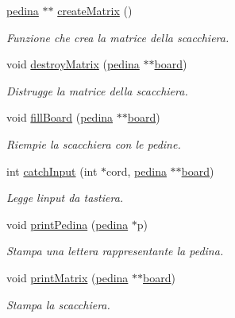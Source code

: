 \begin{DoxyCompactItemize}
\hyperlink{ml__lib_8h_a71fee95122b31f5cb0b07d9c16ffa3a5}{pedina} $\ast$$\ast$ \hyperlink{group__Funzioni_ga4a5eb161590279b5189a68bb27f0882e}{create\+Matrix} ()
\begin{DoxyCompactList}\small\item\em Funzione che crea la matrice della scacchiera. \end{DoxyCompactList}\item 
void \hyperlink{group__Funzioni_ga898a4ffd57725b4666aa768ca71f1e1f}{destroy\+Matrix} (\hyperlink{ml__lib_8h_a71fee95122b31f5cb0b07d9c16ffa3a5}{pedina} $\ast$$\ast$\hyperlink{ml__main_8c_a62a3fe3d1df9ff58883b669f7f24e516}{board})
\begin{DoxyCompactList}\small\item\em Distrugge la matrice della scacchiera. \end{DoxyCompactList}\item 
void \hyperlink{group__Funzioni_ga421a28d47106a4070c6eea92c1401821}{fill\+Board} (\hyperlink{ml__lib_8h_a71fee95122b31f5cb0b07d9c16ffa3a5}{pedina} $\ast$$\ast$\hyperlink{ml__main_8c_a62a3fe3d1df9ff58883b669f7f24e516}{board})
\begin{DoxyCompactList}\small\item\em Riempie la scacchiera con le pedine. \end{DoxyCompactList}\item 
int \hyperlink{group__Funzioni_gaf824dd8c8d8c26d7596de5b635b554e7}{catch\+Input} (int $\ast$cord, \hyperlink{ml__lib_8h_a71fee95122b31f5cb0b07d9c16ffa3a5}{pedina} $\ast$$\ast$\hyperlink{ml__main_8c_a62a3fe3d1df9ff58883b669f7f24e516}{board})
\begin{DoxyCompactList}\small\item\em Legge l\textquotesingle{}input da tastiera. \end{DoxyCompactList}\item 
void \hyperlink{group__Funzioni_ga724261d45664de95115edbec3fec7aef}{print\+Pedina} (\hyperlink{ml__lib_8h_a71fee95122b31f5cb0b07d9c16ffa3a5}{pedina} $\ast$p)
\begin{DoxyCompactList}\small\item\em Stampa una lettera rappresentante la pedina. \end{DoxyCompactList}\item 
void \hyperlink{group__Funzioni_gac5423849c2701b9adbd33225a8a20288}{print\+Matrix} (\hyperlink{ml__lib_8h_a71fee95122b31f5cb0b07d9c16ffa3a5}{pedina} $\ast$$\ast$\hyperlink{ml__main_8c_a62a3fe3d1df9ff58883b669f7f24e516}{board})
\begin{DoxyCompactList}\small\item\em Stampa la scacchiera. \end{DoxyCompactList}\item 
$$
\end{DoxyCompactItemize}
